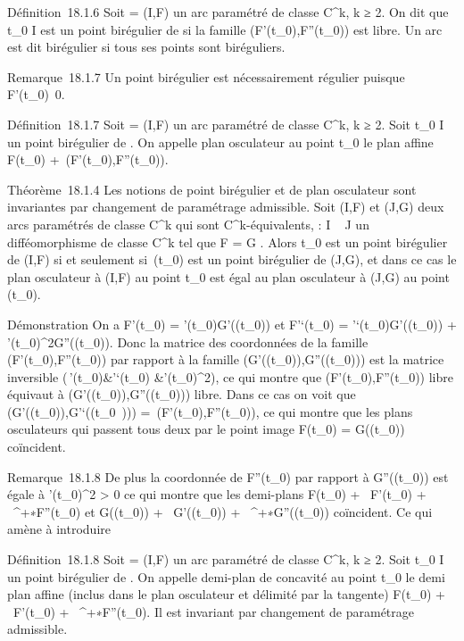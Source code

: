 \documentclass[]{article}
\begin{document}
Définition~18.1.6 Soit \Gamma = (I,F) un arc paramétré de classe
C^k, k ≥ 2. On dit que t_0 \in I est un point
birégulier de \Gamma si la famille (F'(t_0),F''(t_0)) est
libre. Un arc est dit birégulier si tous ses points sont biréguliers.

Remarque~18.1.7 Un point birégulier est nécessairement régulier puisque
F'(t_0)\neq~0.

Définition~18.1.7 Soit \Gamma = (I,F) un arc paramétré de classe
C^k, k ≥ 2. Soit t_0 \in I un point birégulier de \Gamma.
On appelle plan osculateur au point t_0 le plan affine
F(t_0) +\
\mathrmVect(F'(t_0),F''(t_0)).

Théorème~18.1.4 Les notions de point birégulier et de plan osculateur
sont invariantes par changement de paramétrage admissible. Soit (I,F) et
(J,G) deux arcs paramétrés de classe C^k qui sont
C^k-équivalents, \theta : I \rightarrow~ J un difféomorphisme de classe
C^k tel que F = G \cdot \theta. Alors t_0 est un point
birégulier de (I,F) si et seulement si~\theta(t_0) est un point
birégulier de (J,G), et dans ce cas le plan osculateur à (I,F) au point
t_0 est égal au plan osculateur à (J,G) au point
\theta(t_0).

Démonstration On a F'(t_0) =
\theta'(t_0)G'(\theta(t_0)) et F'`(t_0) =
\theta'`(t_0)G'(\theta(t_0)) +
\theta'(t_0)^2G''(\theta(t_0)). Donc la matrice des
coordonnées de la famille (F'(t_0),F''(t_0)) par
rapport à la famille (G'(\theta(t_0)),G''(\theta(t_0))) est la
matrice inversible \left
(\matrix\,\theta'(t_0)&\theta'`(t_0)
&\theta'(t_0)^2\right ), ce qui montre
que (F'(t_0),F''(t_0)) libre équivaut à
(G'(\theta(t_0)),G''(\theta(t_0))) libre. Dans ce cas on voit
que
\mathrmVect(G'(\theta(t_0)),G'`(\theta(t_0~)))
=\
\mathrmVect(F'(t_0),F''(t_0)), ce
qui montre que les plans osculateurs qui passent tous deux par le point
image F(t_0) = G(\theta(t_0)) coïncident.

Remarque~18.1.8 De plus la coordonnée de F''(t_0) par rapport à
G''(\theta(t_0)) est égale à \theta'(t_0)^2
> 0 ce qui montre que les demi-plans F(t_0) +
~F'(t_0) + \mathbb{R}~^+∗F''(t_0) et
G(\theta(t_0)) + \mathbb{R}~G'(\theta(t_0)) +
\mathbb{R}~^+∗G''(\theta(t_0)) coïncident. Ce qui amène à
introduire

Définition~18.1.8 Soit \Gamma = (I,F) un arc paramétré de classe
C^k, k ≥ 2. Soit t_0 \in I un point birégulier de \Gamma.
On appelle demi-plan de concavité au point t_0 le demi plan
affine (inclus dans le plan osculateur et délimité par la tangente)
F(t_0) + \mathbb{R}~F'(t_0) + \mathbb{R}~^+∗F''(t_0).
Il est invariant par changement de paramétrage admissible.
\end{document}
